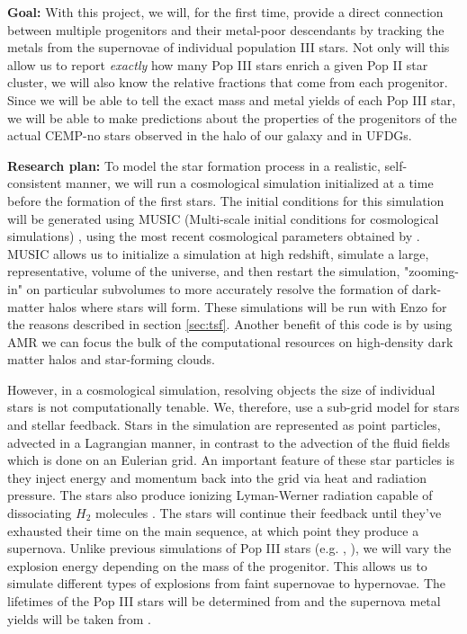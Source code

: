 \documentclass[a4paper, 12pt]{article}
\begin{document}
\textbf{Goal:} With this project, we will, for the first time, provide a direct connection between multiple progenitors and their metal-poor descendants by tracking the metals from the supernovae of individual population III stars. Not only will this allow us to report \textit{exactly} how many Pop III stars enrich a given Pop II star cluster, we will also know the relative fractions that come from each progenitor. Since we will be able to tell the exact mass and metal yields of each Pop III star, we will be able to make predictions about the properties of the progenitors of the actual CEMP-no stars observed in the halo of our galaxy and in UFDGs. 

\textbf{Research plan:} To model the star formation process in a realistic, self-consistent manner, we will run a cosmological simulation initialized at a time before the formation of the first stars. The initial conditions for this simulation will be generated using MUSIC (Multi-scale initial conditions for cosmological simulations) \citep{Hahn2011}, using the most recent cosmological parameters obtained by \cite{Planck2018}. MUSIC allows us to initialize a simulation at high redshift, simulate a large, representative, volume of the universe, and then restart the simulation, "zooming-in" on particular subvolumes to more accurately resolve the formation of dark-matter halos where stars will form. These simulations will be run with Enzo for the reasons described in section \ref{sec:tsf}. Another benefit of this code is by using AMR we can focus the bulk of the computational resources on high-density dark matter halos and star-forming clouds.

However, in a cosmological simulation, resolving objects the size of individual stars is not computationally tenable. We, therefore, use a sub-grid model for stars and stellar feedback. Stars in the simulation are represented as point particles, advected in a Lagrangian manner, in contrast to the advection of the fluid fields which is done on an Eulerian grid. An important feature of these star particles is they inject energy and momentum back into the grid via heat and radiation pressure. The stars also produce ionizing Lyman-Werner radiation capable of dissociating $H_2$ molecules \citep{Safranek-Shrader2012}. The stars will continue their feedback until they've exhausted their time on the main sequence, at which point they produce a supernova. Unlike previous simulations of Pop III stars (e.g. \cite{Chiaki2019}, \cite{Smith2015}), we will vary the explosion energy depending on the mass of the progenitor. This allows us to simulate different types of explosions from faint supernovae to hypernovae. The lifetimes of the Pop III stars will be determined from \cite{Schaerer2002} and the supernova metal yields will be taken from \cite{Nomoto2006}.
\end{document}
